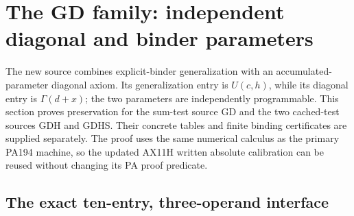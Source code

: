\section{The GD family: independent diagonal and binder parameters}
\label{sec:gd-preservation}

The new source combines explicit-binder generalization with an
accumulated-parameter diagonal axiom.  Its generalization entry is
$U(c,h)$, while its diagonal entry is $\Gamma(d+x)$; the two parameters
are independently programmable.  This section proves preservation for
the sum-test source GD and the two cached-test sources GDH and GDHS.
Their concrete tables and finite binding certificates are supplied
separately.  The proof uses the same numerical calculus as the primary
PA194 machine, so the updated AX11H written absolute calibration can be
reused without changing its PA proof predicate.

\subsection{The exact ten-entry, three-operand interface}

